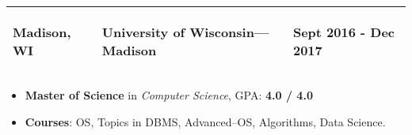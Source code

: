 \documentclass[a4paper, 10pt]{extarticle}
\begin{document}
\begin{large}

{\begin{tabular}{ p{3cm} p{10cm} p{4.4cm} }
    \textbf{Madison, WI} & \vspace{-.6cm} \begin{center}\textbf{{University of
Wisconsin---Madison}} \end{center} \vspace{-0.8cm} &
    \vspace{-0.6cm}
    \begin{flushright}
    \textbf{Sept 2016 - Dec 2017} 
    \end{flushright}
    \vspace{-0.8cm}\\
        \hline
\end{tabular}}
\vspace{-0.2cm}
\begin{itemize}
    \item {\textbf{Master of Science} in \textit{Computer Science}, GPA:
\textbf{4.0 / 4.0}}
    \vspace{-.2cm}
    \item{\textbf{Courses}: OS, Topics in DBMS,  Advanced--OS, Algorithms, Data
Science.}
\end{itemize}


\end{large}
\end{document}
